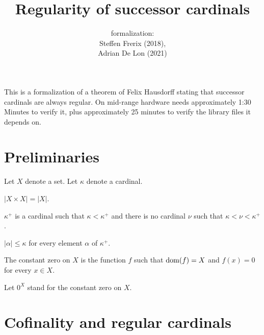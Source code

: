 \documentclass{article}
\title{Regularity of successor cardinals}
\author{\Naproche formalization: \vspace{0.5em} \\
Steffen Frerix (2018), \\
Adrian De Lon (2021)}
\date{}
\begin{document}
  \maketitle

  \noindent This is a formalization of a theorem of Felix Hausdorff stating that
  successor cardinals are always regular.
  On mid-range hardware \Naproche needs approximately 1:30 Minutes to verify it,
  plus approximately 25 minutes to verify the library files it depends on.


  \section{Preliminaries}

  \begin{forthel}
  \end{forthel}

  \begin{forthel}
    Let $X$ denote a set.
    Let $\kappa$ denote a cardinal.

    \begin{axiom*}
      $|X \times X| = |X|$.
    \end{axiom*}

    \begin{signature*}
      $\kappa^{+}$ is a cardinal such that $\kappa < \kappa^{+}$ and there is no
      cardinal $\nu$ such that $\kappa < \nu < \kappa^{+}$.
    \end{signature*}

    \begin{axiom*}
      $|\alpha| \leq \kappa$ for every element $\alpha$ of $\kappa^{+}$.
    \end{axiom*}

    \begin{definition*}
      The constant zero on $X$ is the function $f$ such that $\operatorname{dom}(f) = X$ and
      $f(x) = 0$ for every $x \in X$.
    \end{definition*}

    Let $0^{X}$ stand for the constant zero on $X$.
  \end{forthel}


  \section{Cofinality and regular cardinals}
\end{document}
